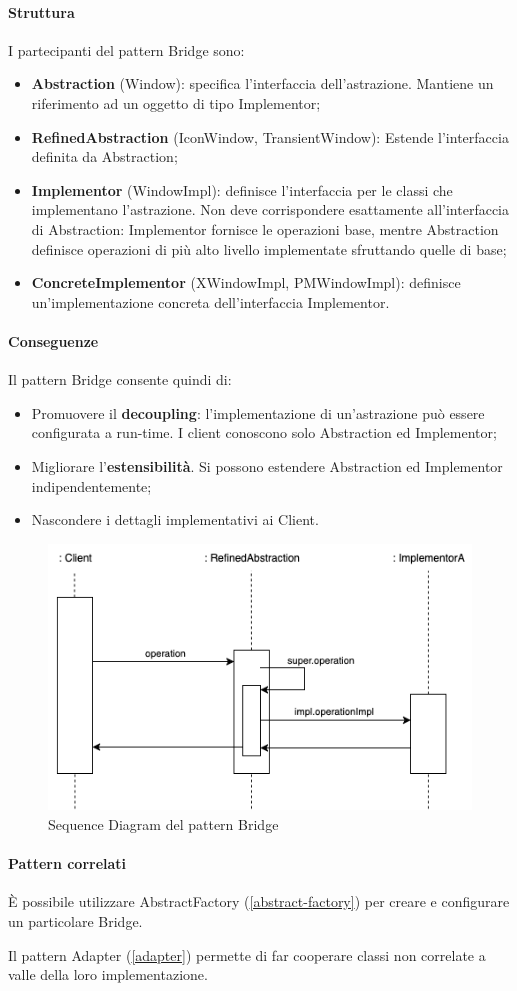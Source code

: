 \paragraph{Struttura} I partecipanti del pattern Bridge sono:
\begin{itemize}
    \item \textbf{Abstraction} (Window): specifica l’interfaccia dell’astrazione. Mantiene un riferimento ad un oggetto di tipo Implementor;
    \item \textbf{RefinedAbstraction} (IconWindow, TransientWindow): Estende l’interfaccia definita da Abstraction;
    \item \textbf{Implementor} (WindowImpl): definisce l’interfaccia per le classi che implementano l’astrazione. Non deve corrispondere esattamente all’interfaccia di Abstraction: Implementor fornisce le operazioni base, mentre Abstraction definisce operazioni di più alto livello implementate sfruttando quelle di base;
    \item \textbf{ConcreteImplementor} (XWindowImpl, PMWindowImpl): definisce un’implementazione concreta dell’interfaccia Implementor.
\end{itemize}

\paragraph{Conseguenze} Il pattern Bridge consente quindi di:
\begin{itemize}
    \item Promuovere il \textbf{decoupling}: l'implementazione di un'astrazione può essere configurata a run-time. I client conoscono solo Abstraction ed Implementor;
    \item Migliorare l'\textbf{estensibilità}. Si possono estendere Abstraction ed Implementor indipendentemente;
    \item Nascondere i dettagli implementativi ai Client.
\end{itemize}

\begin{figure}[H]
    \centering
    \includegraphics[width=0.75\linewidth]{assets/pattern/bridge/bridge-sequence.drawio.png}
    \caption{Sequence Diagram del pattern Bridge}
\end{figure}

\paragraph{Pattern correlati} È possibile utilizzare AbstractFactory (\ref{abstract-factory}) per creare e configurare un particolare Bridge.

Il pattern Adapter (\ref{adapter}) permette di far cooperare classi non correlate a valle della loro implementazione.

\newpage
